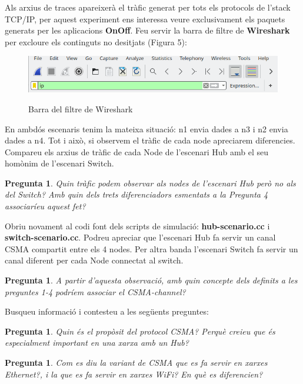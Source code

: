 \documentclass[12pt,a4paper]{article}
\newcounter{exercises}
\newtheorem{exer}[exercises]{Pregunta}
\begin{document}
\begin{enumerate}
Als arxius de traces apareixerà el tràfic generat per tots els protocols de l'stack TCP/IP, per aquest experiment ens interessa veure exclusivament els paquets generats per les aplicacions \textbf{OnOff}. Feu servir la barra de filtre de \textbf{Wireshark} per excloure els continguts no desitjats (Figura 5):

\begin{figure}[!ht]
  \begin{center}
    \includegraphics[width=1\textwidth]{wireshark-filter}    
    \label{wireshark-filter}
    \caption{Barra del filtre de Wireshark}
  \end{center}
\end{figure}

En ambdós escenaris tenim la mateixa situació: n1 envia dades a n3 i n2 envia dades a n4. Tot i això, si observem el tràfic de cada node apreciarem diferencies. Compareu els arxius de tràfic de cada Node de l'escenari Hub amb el seu homònim de l'escenari Switch.

\begin{exer} Quin tràfic podem observar als nodes de l'escenari Hub però no als del Switch? Amb quin dels trets diferenciadors esmentats a la Pregunta 4 associaríeu aquest fet?\end{exer}

Obriu novament al codi font dels scripts de simulació: \textbf{hub-scenario.cc} i \textbf{switch-scenario.cc}. Podreu apreciar que l'escenari Hub fa servir un canal CSMA compartit entre els 4 nodes. Per altra banda l'escenari Switch fa servir un canal diferent per cada Node connectat al switch.

\begin{exer} A partir d'aquesta observació, amb quin concepte dels definits a les preguntes 1-4 podríem associar el CSMA-channel? \end{exer}

Busqueu informació i contesteu a les següents preguntes:
\begin{exer} Quin és el propòsit del protocol CSMA? Perquè creieu que és especialment important en una xarxa amb un Hub?\end{exer}
\begin{exer} Com es diu la variant de CSMA que es fa servir en xarxes Ethernet?, i la que es fa servir en xarxes WiFi? En què es diferencien? \end{exer}


\end{enumerate}
\end{document}
